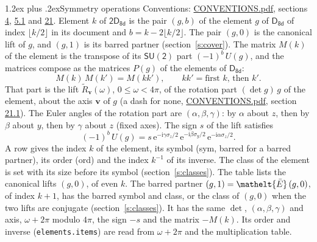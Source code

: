 \documentclass[10pt,a4paper]{article}
\makeatletter
\renewcommand\section{\@startsection{section}{1}{\z@}{-3ex plus -1ex minus -.2ex}%
  {1.2ex plus .2ex}{\normalfont\large\sffamily\bfseries\color{parttitle}}}
\numberwithin{equation}{section}
\newcommand{\eltfont}[1]{{\let\sigma\eltsigma\mathelt{#1}}}
\newcommand{\grp}[1]{\mathsf{#1}}
\newcommand{\elt}[1]{\eltfont{#1}}
\newcommand{\vv}{\mathbf{v}}
\newcommand{\iunit}{\mathrm{i}}
\newcommand{\expe}{\mathrm{e}}
\newcommand{\barred}[1]{\bar{#1}}
\newcommand{\lift}[1]{\tilde{#1}}
\newcommand{\pauli}[1]{\sigma_{#1}}
\makeatother
\begin{document}
\section{Symmetry operations}\label{s:elements}
Conventions: \href{../../CONVENTIONS.pdf}{CONVENTIONS.pdf}, sections \href{../../../rotation/CONVENTIONS.pdf\#conv.4}{4}, \href{../../../rotation/CONVENTIONS.pdf\#conv.5.1}{5.1} and \href{../../CONVENTIONS.pdf\#conv.21}{21}.
\leavevmode\label{n:index.element}\label{n:element.g}Element $k$ of $\grp{2D_{8d}}$ is the pair $(g, b)$ of the element $g$ of \href{../../../rotation/data/pdf/D8d.pdf}{$\grp{D_{8d}}$} of index $\lfloor k/2\rfloor$ in its document and $b = k - 2\lfloor k/2\rfloor$. The pair $(g, 0)$ is the canonical lift of $g$, and $(g, 1)$ is its barred partner (section~\ref{s:cover}). \label{n:matrix.element.pin}\label{n:matrix.element}The matrix $M(k)$ of the element is the transpose of its $\grp{SU(2)}$ part $(-1)^{b}\,U(g)$, and the matrices compose as the matrices $P(g)$ of the elements of $\grp{D_{8d}}$:
\begin{equation}\label{e:mprod}M(k)\,M(k') = M(kk'),\qquad kk' = \text{first } k\text{, then } k'.\end{equation}
\leavevmode\label{n:angle.omega}\label{n:vector.axis}\label{n:vector.pole}That part is the lift $\lift{R}_{\vv}(\omega)$, $0 \le \omega < 4\pi$, of the rotation part $(\det g)\,g$ of the element, about the axis $\vv$ of $g$ (a dash for none, \href{../../CONVENTIONS.pdf}{CONVENTIONS.pdf}, section \href{../../CONVENTIONS.pdf\#conv.21.1}{21.1}). \label{n:angle.euler.alpha}\label{n:angle.euler.beta}\label{n:angle.euler.gamma}\label{n:vector.coordinates}The Euler angles of the rotation part are $(\alpha,\beta,\gamma)$: by $\alpha$ about $z$, then by $\beta$ about $y$, then by $\gamma$ about $z$ (fixed axes). \label{n:local.euler.sign}The sign $s$ of the lift satisfies
\begin{equation}\label{e:euler}(-1)^{b}\,U(g) = s\,\expe^{-\iunit\gamma\pauli{z}/2}\,\expe^{-\iunit\beta\pauli{y}/2}\,\expe^{-\iunit\alpha\pauli{z}/2}.\end{equation}
\leavevmode\label{n:index.element.inverse}\label{n:head.sym}\label{n:head.ord}A row gives the index $k$ of the element, its symbol (sym, barred for a barred partner), its order (ord) and the index $k^{-1}$ of its inverse. \label{n:head.class}The class of the element is set with its size before its symbol (section~\ref{s:classes}).
The table lists the canonical lifts $(g, 0)$, of even $k$. The barred partner $(g, 1) = \elt{\barred{E}}\,(g, 0)$, of index $k + 1$, has the barred symbol and class, or the class of $(g, 0)$ when the two lifts are conjugate (section~\ref{s:classes}). It has the same $\det$, $(\alpha,\beta,\gamma)$ and axis, $\omega + 2\pi$ modulo $4\pi$, the sign $-s$ and the matrix $-M(k)$. Its order and inverse (\texttt{elements.items}) are read from $\omega + 2\pi$ and the multiplication table.
\end{document}
